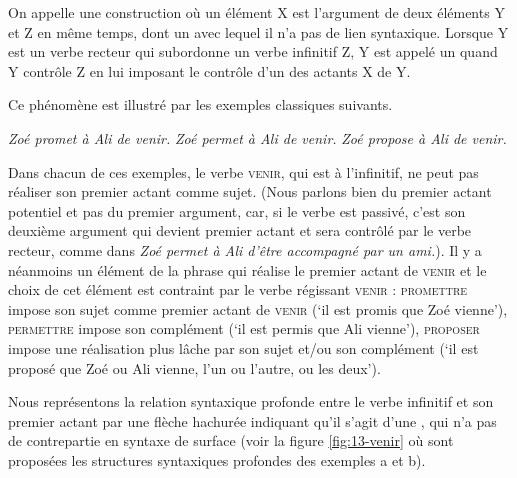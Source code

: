 {On appelle  une construction où un élément X est l’argument de deux éléments Y et Z en même temps, dont un avec lequel il n’a pas de lien syntaxique. Lorsque Y est un verbe recteur qui subordonne un verbe infinitif Z, Y est appelé un  quand Y contrôle Z en lui imposant le contrôle d’un des actants X de Y.}

Ce phénomène est illustré par les exemples classiques suivants.

\ea\label{ex:13-venir}
\ea\textit{Zoé promet à Ali de venir.}
\ex\textit{Zoé permet à Ali de venir.}
\ex\textit{Zoé propose à Ali de venir.}\z\z

Dans chacun de ces exemples, le verbe \textsc{venir}, qui est à l’infinitif, ne peut pas réaliser son premier actant comme sujet. (Nous parlons bien du premier actant potentiel et pas du premier argument, car, si le verbe est passivé, c’est son deuxième argument qui devient premier actant et sera contrôlé par le verbe recteur, comme dans \textit{Zoé permet à Ali d’être accompagné par un ami.}). Il y a néanmoins un élément de la phrase qui réalise le premier actant de \textsc{venir} et le choix de cet élément est contraint par le verbe régissant \textsc{venir} : \textsc{promettre} impose son sujet comme premier actant de \textsc{venir}  (‘il est promis que Zoé vienne’), \textsc{permettre} impose son complément  (‘il est permis que Ali vienne’), \textsc{proposer} impose une réalisation plus lâche par son sujet et/ou son complément  (‘il est proposé que Zoé ou Ali vienne, l’un ou l’autre, ou les deux’).

Nous représentons la relation syntaxique profonde entre le verbe infinitif et son premier actant par une flèche hachurée indiquant qu’il s’agit d’une , qui n’a pas de contrepartie en syntaxe de surface (voir la figure \ref{fig:13-venir} où sont proposées les structures syntaxiques profondes des exemples a et b).


